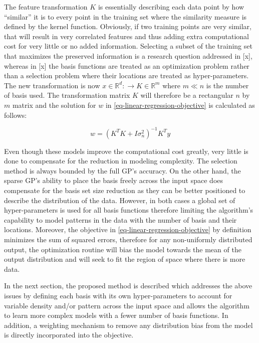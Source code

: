 \documentclass[useAMS,usenatbib,fleqn]{mn2e}
\begin{document}
The feature transformation $K$ is essentially describing each data point by how ``similar'' it is to every point in the training set where the similarity measure is defined by the kernel function. Obviously, if two training points are very similar, that will result in very correlated features and thus adding extra computational cost for very little or no added information. Selecting a subset of the training set that maximizes the preserved information is a research question addressed in [x], whereas in [x] the basis functions are treated as an optimization problem rather than a selection problem where their locations are treated as hyper-parameters. The new transformation is now $x\in \mathbb{R}^{d}:\rightarrow K\in \mathbb{R}^{m}$ where $m\ll n$ is the number of basis used. The transformation matrix $K$ will therefore be a rectangular $n$ by $m$ matrix and the solution for $w$ in \eqref{eq-linear-regression-objective} is calculated as follows:

\begin{equation}
\label{eq-linear-regression-objective-rectangular}
w = \left(K^{T}K+I\sigma_{n}^{2} \right)^{-1}K^{T}y
\end{equation}

Even though these models improve the computational cost greatly, very little is done to compensate for the reduction in modeling complexity. The selection method is always bounded by the full GP's accuracy. On the other hand, the sparse GP's ability to place the basis freely across the input space does compensate for the basis set size reduction as they can be better positioned to describe the distribution of the data. However, in both cases a global set of hyper-parameters is used for all basis functions therefore limiting the algorithm's capability to model patterns in the data with the number of basis and their locations. Moreover, the objective in \eqref{eq-linear-regression-objective} by definition minimizes the sum of squared errors, therefore for any non-uniformly distributed output, the optimization routine will bias the model towards the mean of the output distribution and will seek to fit the region of space where there is more data.

In the next section, the proposed method is described which addresses the above issues by defining each basis with its own hyper-parameters to account for variable density and/or pattern across the input space and allows the algorithm to learn more complex models with a fewer number of basis functions. In addition, a weighting mechanism to remove any distribution bias from the model is directly incorporated into the objective.
\end{document}
